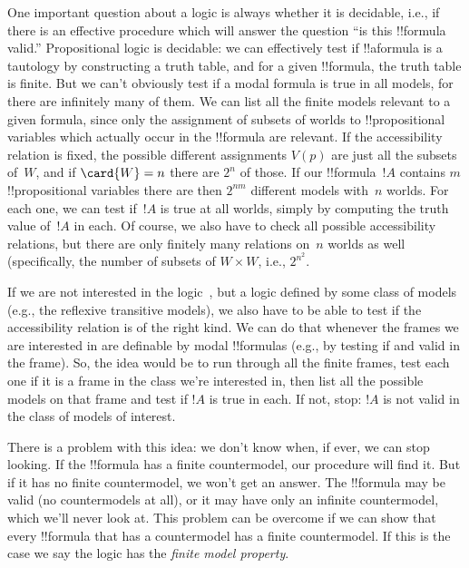 \documentclass[../../../include/open-logic-section]{subfiles}
\begin{document}


One important question about a logic is always whether it is
decidable, i.e., if there is an effective procedure which will answer
the question ``is this !!{formula} valid.'' Propositional logic is
decidable: we can effectively test if !!a{formula} is a tautology by
constructing a truth table, and for a given !!{formula}, the truth
table is finite.  But we can't obviously test if a modal formula is
true in all models, for there are infinitely many of them.  We can
list all the finite models relevant to a given formula, since only the
assignment of subsets of worlds to !!{propositional variable}s which
actually occur in the !!{formula} are relevant. If the accessibility
relation is fixed, the possible different assignments $V(p)$ are just
all the subsets of~$W$, and if $\card{W} = n$ there are $2^n$ of
those. If our !!{formula}~$!A$ contains $m$ !!{propositional
  variable}s there are then $2^{nm}$ different models with~$n$
worlds. For each one, we can test if~$!A$ is true at all worlds,
simply by computing the truth value of~$!A$ in each. Of course, we
also have to check all possible accessibility relations, but there are
only finitely many relations on~$n$ worlds as well (specifically, the
number of subsets of $W \times W$, i.e., $2^{n^2}$.

If we are not interested in the logic~, but a logic defined by
some class of models (e.g., the reflexive transitive models), we also
have to be able to test if the accessibility relation is of the right
kind. We can do that whenever the frames we are interested in are
definable by modal !!{formula}s (e.g., by testing if  and 
valid in the frame). So, the idea would be to run through all the
finite frames, test each one if it is a frame in the class we're
interested in, then list all the possible models on that frame and
test if $!A$ is true in each. If not, stop: $!A$ is not valid in the
class of models of interest.

There is a problem with this idea: we don't know when, if ever, we can
stop looking. If the !!{formula} has a finite countermodel, our procedure will
find it. But if it has no finite countermodel, we won't get an
answer. The !!{formula} may be valid (no countermodels at all), or it
may have only an infinite countermodel, which we'll never look at. This
problem can be overcome if we can show that every !!{formula} that has
a countermodel has a finite countermodel. If this is the case we say
the logic has the \emph{finite model property}.
\end{document}
